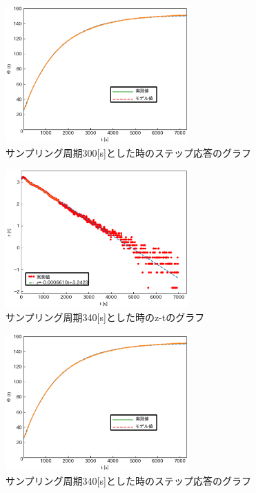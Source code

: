 \documentclass[12pt]{jsarticle}
\begin{document}
\begin{figure}[H]
  \begin{center}
    \includegraphics[clip,width=7.0cm]{../graph/step_response300s.eps}
    \caption{サンプリング周期300[s]とした時のステップ応答のグラフ}
    \label{step_response300s}
  \end{center}
\end{figure}
\begin{figure}[H]
  \begin{center}
    \includegraphics[clip,width=7.0cm]{../graph/z-t340s.eps}
    \caption{サンプリング周期340[s]とした時のz-tのグラフ}
    \label{z-t_h1=340s}
  \end{center}
\end{figure}
\begin{figure}[H]
  \begin{center}
    \includegraphics[clip,width=7.0cm]{../graph/step_response340s.eps}
    \caption{サンプリング周期340[s]とした時のステップ応答のグラフ}
    \label{step_response340s}
  \end{center}
\end{figure}
\end{document}
